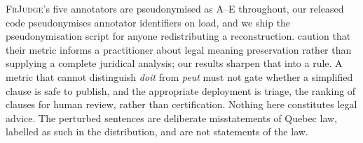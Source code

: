 \documentclass[11pt]{article}
\begin{document}
\textsc{FrJudge}'s five annotators are pseudonymised as A--E throughout, our
released code pseudonymises annotator identifiers on load, and we ship the
pseudonymisation script for anyone redistributing a reconstruction.
\citet{beauchemin2025judgebert} caution that their metric informs a practitioner
about legal meaning preservation rather than supplying a complete juridical
analysis; our results sharpen that into a rule. A metric that cannot distinguish
\emph{doit} from \emph{peut} must not gate whether a simplified clause is safe to
publish, and the appropriate deployment is triage, the ranking of clauses for
human review, rather than certification. Nothing here
constitutes legal advice. The perturbed sentences are deliberate misstatements
of Quebec law, labelled as such in the distribution, and are not statements of
the law.


\end{document}
